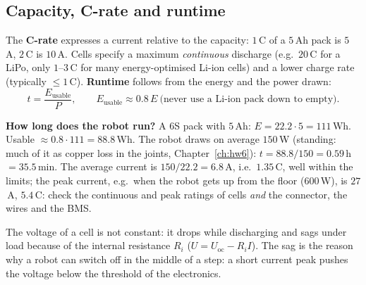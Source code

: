 \subsection*{Capacity, C-rate and runtime}
The \textbf{C-rate} expresses a current relative to the capacity: $1$\,C of a $5$\,Ah pack is $5$\,A, $2$\,C is $10$\,A. Cells specify a maximum \emph{continuous} discharge (e.g.\ $20$\,C for a LiPo, only $1$--$3$\,C for many energy-optimised Li-ion cells) and a lower charge rate (typically $\le1$\,C). \textbf{Runtime} follows from the energy and the power drawn:
\[
t=\frac{E_\text{usable}}{P},\qquad E_\text{usable}\approx0.8\,E\ \text{(never use a Li-ion pack down to empty).}
\]
\begin{example}
\textbf{How long does the robot run?} A 6S pack with $5$\,Ah: $E=22.2\cdot5=111$\,Wh. Usable $\approx0.8\cdot111=88.8$\,Wh. The robot draws on average $150$\,W (standing: much of it as copper loss in the joints, Chapter~\ref{ch:hw6}): $t=88.8/150=0.59$\,h $=35.5$\,min. The average current is $150/22.2=6.8$\,A, i.e.\ $1.35$\,C, well within the limits; the peak current, e.g.\ when the robot gets up from the floor ($600$\,W), is $27$\,A, $5.4$\,C: check the continuous and peak ratings of cells \emph{and} the connector, the wires and the BMS.
\end{example}
The voltage of a cell is not constant: it drops while discharging and sags under load because of the internal resistance $R_i$ ($U=U_\text{oc}-R_iI$). The sag is the reason why a robot can switch off in the middle of a step: a short current peak pushes the voltage below the threshold of the electronics.
\begin{center}
\label{fig:hw8_dis}
\end{center}

